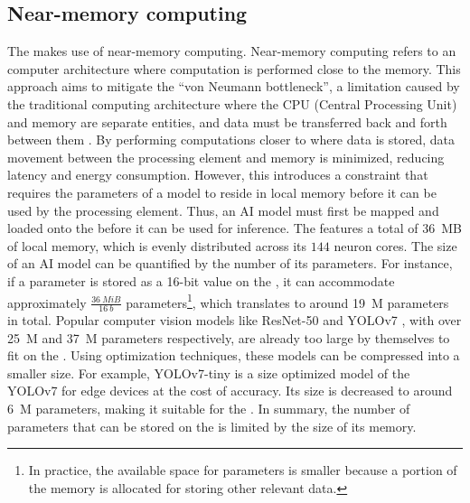 \subsection{Near-memory computing}
The \graicore{} makes use of near-memory computing.
Near-memory computing refers to an computer architecture where computation is performed close to the memory.
This approach aims to mitigate the ``von Neumann bottleneck'', a limitation caused by the traditional computing architecture where the CPU (Central Processing Unit) and memory are separate entities, and data must be transferred back and forth between them \cite{indiveriMemoryInformationProcessing2015}.
By performing computations closer to where data is stored, data movement between the processing element and memory is minimized, reducing latency and energy consumption.
However, this introduces a constraint that requires the parameters of a model to reside in local memory before it can be used by the processing element.
Thus, an AI model must first be mapped and loaded onto the \graicore{} before it can be used for inference.
The \graicore{} features a total of \SI{36}{MB} of local memory, which is evenly distributed across its $144$ neuron cores.
The size of an AI model can be quantified by the number of its parameters.
For instance, if a parameter is stored as a 16-bit value on the \graicore{}, it can accommodate approximately $\frac{\SI{36}{MiB}}{\SI{16}{b}}$ parameters\footnote{In practice, the available space for parameters is smaller because a portion of the memory is allocated for storing other relevant data.}, which translates to around \SI{19}{M} parameters in total.
Popular computer vision models like ResNet-50 \cite{heDeepResidualLearning2015} and YOLOv7 \cite{wangYOLOv7TrainableBagoffreebies2022}, with over \SI{25}{M} and \SI{37}{M} parameters respectively, are already too large by themselves to fit on the \graicore{}.
Using optimization techniques, these models can be compressed into a smaller size.
For example, YOLOv7-tiny \cite{wangYOLOv7TrainableBagoffreebies2022} is a size optimized model of the YOLOv7 for edge devices at the cost of accuracy.
Its size is decreased to around \SI{6}{M} parameters, making it suitable for the \graicore{}.
In summary, the number of parameters that can be stored on the \graicore{} is limited by the size of its memory.

